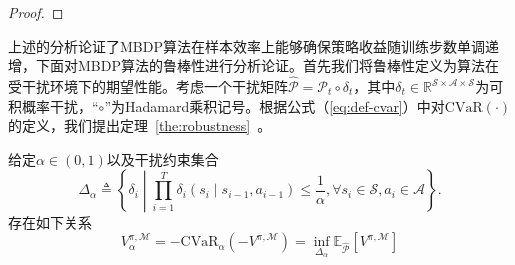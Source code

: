 \begin{proof}
\end{proof}

上述的分析论证了MBDP算法在样本效率上能够确保策略收益随训练步数单调递增，下面对MBDP算法的鲁棒性进行分析论证。首先我们将鲁棒性定义为算法在受干扰环境下的期望性能。考虑一个干扰矩阵$\hat{\mathcal{P}}=\mathcal{P}_t \circ \delta_t$，其中$\delta_t\in\mathbb{R}^{\mathcal{S}\times\mathcal{A}\times\mathcal{S}}$为可积概率干扰，“$\circ$”为Hadamard乘积记号。根据公式（\ref{eq:def-cvar}）中对$\mathrm{CVaR}(\cdot)$的定义，我们提出定理~\ref{the:robustness}~。

\begin{theorem}\label{the:robustness}
给定$\alpha\in(0,1)$以及干扰约束集合
\begin{equation}\label{eq:supp-perturbation}
    \Delta_\alpha \triangleq \left\{\delta_i\middle\vert\prod_{i=1}^{T}\delta_i(s_i\mid s_{i-1},a_{i-1})\leq \frac{1}{\alpha}, \forall s_i\in\mathcal{S}, a_i\in\mathcal{A}\right\}.
\end{equation}
存在如下关系
\begin{equation}\label{eq:return-cvar-rob}
    V_\alpha^{\pi,\mathcal{M}} = -\mathrm{CVaR}_\alpha\left(-V^{\pi,\mathcal{M}}\right)=\inf\limits_{\Delta_\alpha}\mathbb{E}_{\hat{\mathcal{P}}}\left[V^{\pi,\mathcal{M}}\right]
\end{equation}
\end{theorem}

